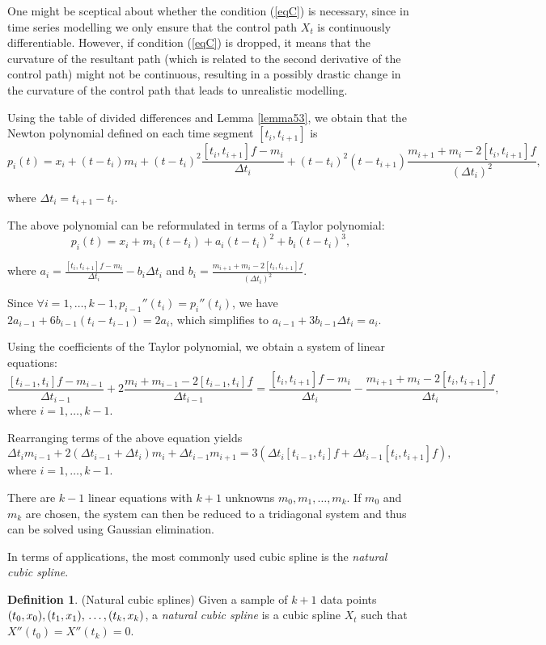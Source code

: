 \documentclass[a4paper,11pt,titlepage]{article}
\theoremstyle{definition}
\newtheorem{definition}{Definition}[section]
\theoremstyle{plain}
\theoremstyle{remark}
\begin{document}
One might be sceptical about whether the condition (\ref{eqC}) is necessary, since in time series modelling we only ensure that the control path $X_t$ is continuously differentiable. However, if condition (\ref{eqC}) is dropped, it means that the curvature of the resultant path (which is related to the second derivative of the control path) might not be continuous, resulting in a possibly drastic change in the curvature of the control path that leads to unrealistic modelling.

Using the table of divided differences and Lemma \ref{lemma53}, we obtain that the Newton polynomial defined on each time segment $[t_i,t_{i+1}]$ is
$$p_i(t)=x_i+(t-t_i)m_i+(t-t_i)^2\frac{[t_i,t_{i+1}]f-m_i}{\Delta t_i}+(t-t_i)^2(t-t_{i+1})\frac{m_{i+1}+m_i-2[t_i,t_{i+1}]f}{(\Delta t_i)^2},$$

where $\Delta t_i=t_{i+1}-t_i$.

The above polynomial can be reformulated in terms of a Taylor polynomial:
$$p_i(t)=x_i+m_i(t-t_i)+a_i(t-t_i)^2+b_i(t-t_i)^3,$$

where $\displaystyle a_i=\frac{[t_i,t_{i+1}]f-m_i}{\Delta t_i}-b_i\Delta t_i$ and $\displaystyle b_i=\frac{m_{i+1}+m_i-2[t_i,t_{i+1}]f}{(\Delta t_i)^2}$.

Since $\forall i=1,\dots,k-1, p_{i-1}''(t_i)=p_i''(t_i)$, we have $2a_{i-1}+6b_{i-1}(t_i-t_{i-1})=2a_i$, which simplifies to $a_{i-1}+3b_{i-1}\Delta t_i=a_i$.

Using the coefficients of the Taylor polynomial, we obtain a system of linear equations:
$$\frac{[t_{i-1},t_i]f-m_{i-1}}{\Delta t_{i-1}}+2\frac{m_i+m_{i-1}-2[t_{i-1},t_i]f}{\Delta t_{i-1}}=\frac{[t_i,t_{i+1}]f-m_i}{\Delta t_{i}}-\frac{m_{i+1}+m_{i}-2[t_{i},t_{i+1}]f}{\Delta t_{i}},$$
where $i=1,\dots,k-1$.

Rearranging terms of the above equation yields
$$\Delta t_im_{i-1}+2(\Delta t_{i-1}+\Delta t_i)m_i+\Delta t_{i-1}m_{i+1}=3(\Delta t_i[t_{i-1},t_i]f+\Delta t_{i-1}[t_i,t_{i+1}]f),$$
where $i=1,\dots,k-1$.

There are $k-1$ linear equations with $k+1$ unknowns $m_0,m_1,\dots,m_k$. If $m_0$ and $m_k$ are chosen, the system can then be reduced to a tridiagonal system and thus can be solved using Gaussian elimination.

In terms of applications, the most commonly used cubic spline is the \textit{natural cubic spline}.
\begin{definition}
    (Natural cubic splines) Given a sample of $k+1$ data points
$(t_0,x_0), (t_1,x_1), \\\dots, (t_k,x_k)$, a \textit{natural cubic spline} is a cubic spline $X_t$ such that $X''(t_0)=X''(t_k)=0$.
\end{definition}
\end{document}
